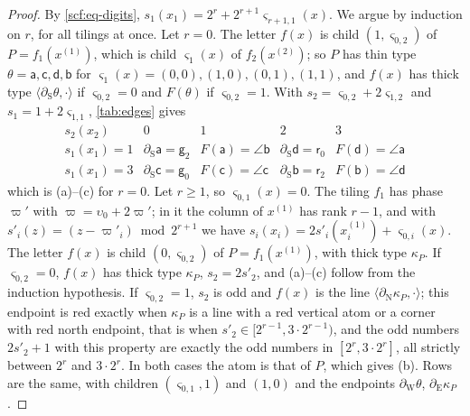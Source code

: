 \begin{proof}
By \eqref{scf:eq-digits}, $s_1(x_1)=2^r+2^{r+1}\varsigma_{r+1,1}(x)$. We argue by induction on $r$, for all tilings at once. Let $r=0$. The letter $f(x)$ is child $(1,\varsigma_{0,2})$ of $P=f_1(x^{(1)})$, which is child $\varsigma_1(x)$ of $f_2(x^{(2)})$; so $P$ has thin type $\theta=\mathsf a,\mathsf c,\mathsf d,\mathsf b$ for $\varsigma_1(x)=(0,0),(1,0),(0,1),(1,1)$, and $f(x)$ has thick type $\langle\partial_{\mathrm S}\theta,\cdot\rangle$ if $\varsigma_{0,2}=0$ and $F(\theta)$ if $\varsigma_{0,2}=1$. With $s_2=\varsigma_{0,2}+2\varsigma_{1,2}$ and $s_1=1+2\varsigma_{1,1}$, \cref{tab:edges} gives
\[
\begin{array}{c|cccc}
s_2(x_2) & 0 & 1 & 2 & 3\\\hline
s_1(x_1)=1 & \partial_{\mathrm S}\mathsf a=\mathsf g_2 & F(\mathsf a)=\angle\mathsf b & \partial_{\mathrm S}\mathsf d=\mathsf r_0 & F(\mathsf d)=\angle\mathsf a\\
s_1(x_1)=3 & \partial_{\mathrm S}\mathsf c=\mathsf g_0 & F(\mathsf c)=\angle\mathsf c & \partial_{\mathrm S}\mathsf b=\mathsf r_2 & F(\mathsf b)=\angle\mathsf d
\end{array}
\]
which is (a)--(c) for $r=0$. Let $r\ge1$, so $\varsigma_{0,1}(x)=0$. The tiling $f_1$ has phase $\varpi'$ with $\varpi=\upsilon_0+2\varpi'$; in it the column of $x^{(1)}$ has rank $r-1$, and with $s'_i(z)=(z-\varpi'_i)\bmod2^{r+1}$ we have $s_i(x_i)=2s'_i(x^{(1)}_i)+\varsigma_{0,i}(x)$. The letter $f(x)$ is child $(0,\varsigma_{0,2})$ of $P=f_1(x^{(1)})$, with thick type $\kappa_P$. If $\varsigma_{0,2}=0$, $f(x)$ has thick type $\kappa_P$, $s_2=2s'_2$, and (a)--(c) follow from the induction hypothesis. If $\varsigma_{0,2}=1$, $s_2$ is odd and $f(x)$ is the line $\langle\partial_{\mathrm N}\kappa_P,\cdot\rangle$; this endpoint is red exactly when $\kappa_P$ is a line with a red vertical atom or a corner with red north endpoint, that is when $s'_2\in[2^{r-1},3\cdot2^{r-1})$, and the odd numbers $2s'_2+1$ with this property are exactly the odd numbers in $[2^r,3\cdot2^r]$, all strictly between $2^r$ and $3\cdot2^r$. In both cases the atom is that of $P$, which gives (b). Rows are the same, with children $(\varsigma_{0,1},1)$ and $(1,0)$ and the endpoints $\partial_{\mathrm W}\theta$, $\partial_{\mathrm E}\kappa_P$.
\end{proof}

